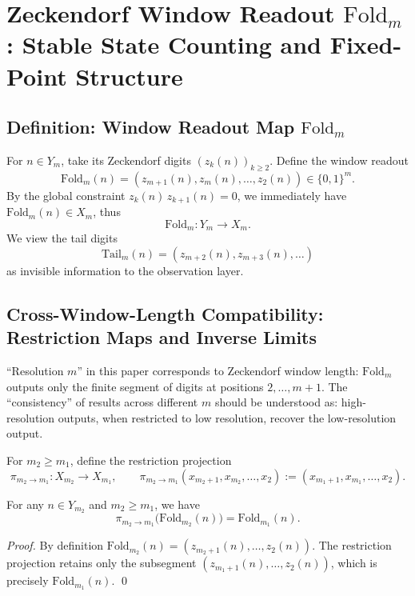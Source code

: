 \section{Zeckendorf Window Readout \texorpdfstring{$\mathrm{Fold}_m$}{Fold\_m}: Stable State Counting and Fixed-Point Structure}

\subsection{Definition: Window Readout Map \texorpdfstring{$\mathrm{Fold}_m$}{Fold\_m}}

For $n\in Y_m$, take its Zeckendorf digits $(z_k(n))_{k\ge 2}$. Define the window readout
\[
\mathrm{Fold}_m(n)=(z_{m+1}(n),z_m(n),\dots,z_2(n))\in\{0,1\}^m.
\]
By the global constraint $z_k(n)\,z_{k+1}(n)=0$, we immediately have $\mathrm{Fold}_m(n)\in X_m$, thus
\[
\mathrm{Fold}_m:Y_m\to X_m.
\]
We view the tail digits
\[
\mathrm{Tail}_m(n)=(z_{m+2}(n),z_{m+3}(n),\dots)
\]
as invisible information to the observation layer.

\subsection{Cross-Window-Length Compatibility: Restriction Maps and Inverse Limits}\label{subsec:foldm-compat-inverse}

``Resolution $m$'' in this paper corresponds to Zeckendorf window length: $\mathrm{Fold}_m$ outputs only the finite segment of digits at positions $2,\dots,m+1$. The ``consistency'' of results across different $m$ should be understood as: high-resolution outputs, when restricted to low resolution, recover the low-resolution output.

\begin{definition}\label{def:foldm-pi}
For $m_2\ge m_1$, define the restriction projection
\[
\pi_{m_2\to m_1}:X_{m_2}\to X_{m_1},\qquad
\pi_{m_2\to m_1}(x_{m_2+1},x_{m_2},\dots,x_2):=(x_{m_1+1},x_{m_1},\dots,x_2).
\]
\end{definition}

\begin{lemma}\label{lem:foldm-pointwise-compat}
For any $n\in Y_{m_2}$ and $m_2\ge m_1$, we have
\[
\pi_{m_2\to m_1}\bigl(\mathrm{Fold}_{m_2}(n)\bigr)=\mathrm{Fold}_{m_1}(n).
\]
\end{lemma}

\begin{proof}
By definition $\mathrm{Fold}_{m_2}(n)=(z_{m_2+1}(n),\dots,z_2(n))$. The restriction projection retains only the subsegment $(z_{m_1+1}(n),\dots,z_2(n))$, which is precisely $\mathrm{Fold}_{m_1}(n)$. \qed
\end{proof}

